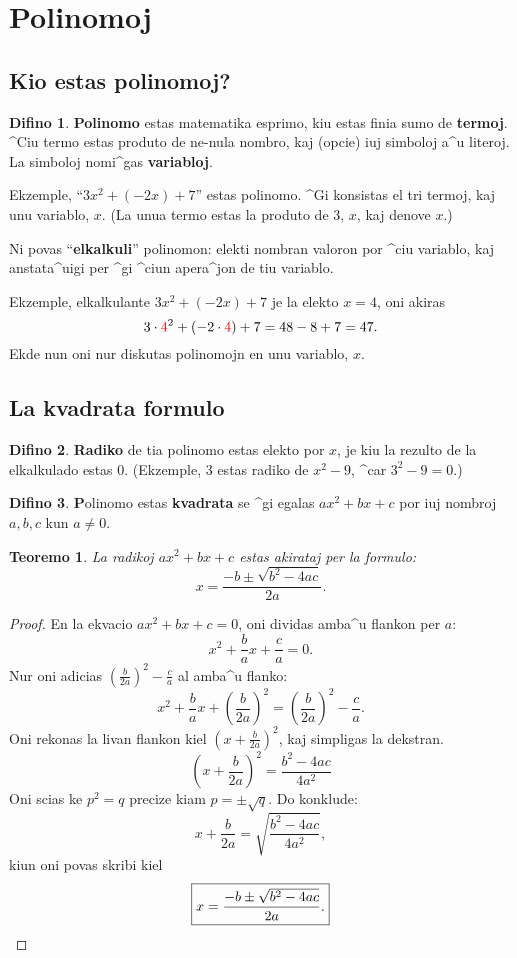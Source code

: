 \documentclass[12pt,a4paper]{article}
\theoremstyle{plain}\newtheorem*{mythm}{Teoremo}
\theoremstyle{definition}\newtheorem*{mydef}{Difino}
\newcommand{\red}[1]{{\color{red}#1}}
\begin{document}
\section{Polinomoj}
\subsection{Kio estas polinomoj?}
\begin{mydef}
	\textbf{Polinomo} estas matematika esprimo, kiu estas finia sumo de \textbf{termoj}. ^Ciu termo estas produto de ne-nula nombro, kaj (opcie) iuj simboloj a^u literoj. La simboloj nomi^gas \textbf{variabloj}.
\end{mydef}

Ekzemple, ``$3x^2 + (-2x) + 7$'' estas polinomo. ^Gi konsistas el tri termoj, kaj unu variablo, $x$. (La unua termo estas la produto de $3$, $x$, kaj denove $x$.)

Ni povas ``\textbf{elkalkuli}'' polinomon: elekti nombran valoron por ^ciu variablo, kaj anstata^uigi per ^gi ^ciun apera^jon de tiu variablo.

Ekzemple, elkalkulante $3x^2 + (-2x) + 7$ je la elekto $x=4$, oni akiras \[
	3 \cdot \red{4}^2 + (-2 \cdot \red{4}) + 7 = 48 - 8 + 7 = 47.
\]
Ekde nun oni nur diskutas polinomojn en unu variablo, $x$.

\subsection{La kvadrata formulo}
\begin{mydef}
	\textbf{Radiko} de tia polinomo estas elekto por $x$, je kiu la rezulto de la elkalkulado estas $0$. (Ekzemple, 3 estas radiko de $x^2 - 9$, ^car $3^2 - 9 = 0$.)
\end{mydef}

\begin{mydef}
	\textbf Polinomo estas \textbf{kvadrata} se ^gi egalas $ax^2 + bx + c$ por iuj nombroj $a, b, c$ kun $a \neq 0$.
\end{mydef}

\begin{mythm}
	La radikoj $a x^2 + b x + c$ estas akirataj per la formulo: \[
		\boxed{x = \frac{-b \pm \sqrt{b^2-4ac}}{2a}.}
	\]
\end{mythm}

\begin{proof}
	En la ekvacio $a x^2 + b x + c = 0$, oni dividas amba^u flankon per $a$: \[
		x^2 + \frac{b}{a} x + \frac{c}{a} = 0.
	\]
	Nur oni adicias $\left( \frac{b}{2a} \right)^2 - \frac{c}{a}$ al amba^u flanko: \[
		x^2 + \frac{b}{a} x + \left( \frac{b}{2a} \right)^2 = \left( \frac{b}{2a} \right)^2 - \frac{c}{a}.
	\]
	Oni rekonas la livan flankon kiel $(x + \frac{b}{2a})^2$, kaj simpligas la dekstran. \[
		\left(x + \frac{b}{2a}\right)^2 = \frac{b^2 - 4ac}{4a^2}
	\]
	Oni scias ke $p^2 = q$ precize kiam $p = \pm \sqrt{q}$. Do konklude: \[
		x + \frac{b}{2a} = \sqrt{\frac{b^2 - 4ac}{4a^2}},
	\]
	kiun oni povas skribi kiel \[
		\boxed{x = \frac{-b \pm \sqrt{b^2 - 4ac}}{2a}.} \qedhere
	\]
\end{proof}
\end{document}
